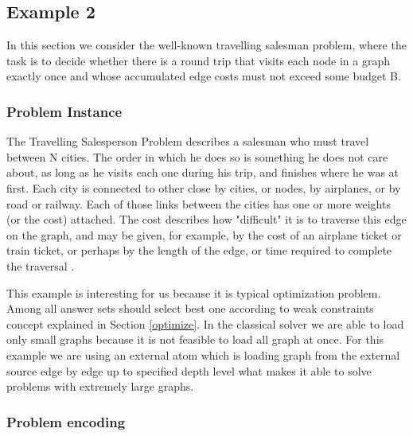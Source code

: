 \documentclass[14pt,a4paper, titlepage]{article}
\begin{document}
\subsection{Example 2}
\label{traveling}
In this section we consider the well-known travelling 
salesman problem, where the task is to decide whether there 
is a round trip that visits each node in a graph exactly 
once and whose accumulated edge costs must not exceed some 
budget B.

\subsubsection{Problem Instance}
The Travelling Salesperson Problem describes a salesman who 
must travel between N cities. The order in which he does so 
is something he does not care about, as long as he visits 
each one during his trip, and finishes where he was at 
first. Each city is connected to other close by cities, or 
nodes, by airplanes, or by road or railway. Each of those 
links between the cities has one or more weights (or the 
cost) attached. The cost describes how "difficult" it is to 
traverse this edge on the graph, and may be given, for 
example, by the cost of an airplane ticket or train ticket, 
or perhaps by the length of the edge, or time required to 
complete the traversal \cite{wiki}.

This example is interesting for us because it is typical 
optimization problem. Among all answer sets \dlvhex{} 
should select best one according to weak constraints 
concept explained in Section \ref{optimize}. In the 
classical solver we are able to load only small graphs 
because it is not feasible to load all graph at once. For 
this example we are using an external atom which is loading 
graph from the external source edge by edge up to specified 
depth level what makes it able to solve problems with 
extremely large graphs.        
\subsubsection{Problem encoding}
\end{document}
